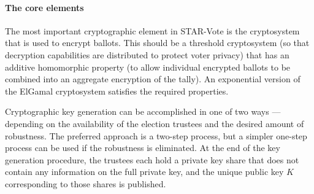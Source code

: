 \label{sec:crypto}



\paragraph{The core elements}
\label{sec:crypto-core}


The most important cryptographic element in STAR-Vote is the cryptosystem
that is used to encrypt ballots.  This should be a threshold cryptosystem
(so that decryption capabilities are distributed to protect voter privacy)
that has an additive homomorphic property (to allow individual encrypted ballots to
be combined into an aggregate encryption of the tally).  An exponential
version of the ElGamal cryptosystem satisfies the required properties.

Cryptographic key generation can be accomplished in one of two ways ---
depending on the availability of the election trustees and the desired
amount of robustness.  The preferred approach is a two-step process,
but a simpler one-step process can be used if the robustness is eliminated.
At the end of the key generation procedure, the trustees each hold a
private key share that does not contain any information on the full
private key, and the unique public key $K$ corresponding to those
shares is published.

